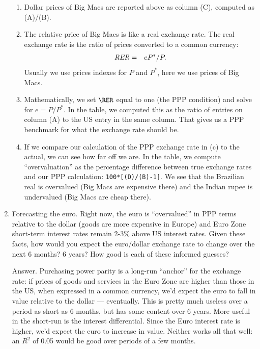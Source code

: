 \begin{enumerate}
\begin{enumerate}
\item Dollar prices of Big Macs are reported above as column (C),
computed as (A)/(B).

\item The relative price of Big Macs is like a real exchange rate.
The real exchange rate is the ratio of prices converted to a common currency:
\begin{eqnarray*}
    \mbox{\it RER\/}  &=&  eP^*/P .
\end{eqnarray*}
Usually we use prices indexes for $P$ and $P^*$, here we use prices of Big Macs.

\item Mathematically, we set $\RER$ equal to one (the PPP condition)
and solve for $e = P/P^*$.
In the table, we computed this as the ratio of entries on column (A) to the US
entry in the same column.
That gives us a PPP benchmark for what the exchange rate should be.

\item If we compare our calculation of the PPP exchange rate in (c) to the actual,
we can see how far off we are.
In the table, we compute ``overvaluation'' as the percentage difference between
true exchange rates and our PPP calculation:  {\tt 100*[(D)/(B)-1]}.
We see that the Brazilian real is overvalued (Big Macs are expensive there)
and the Indian rupee is undervalued (Big Macs are cheap there).
\end{enumerate}

\item Forecasting the euro.
Right now, the euro is ``overvalued'' in PPP terms relative to the
dollar (goods are more expensive in Europe) and Euro Zone short-term interest rates remain 2-3\% above US interest rates.
Given these facts, how would you expect the euro/dollar exchange rate to change over the next 6 months?  6 years?
How good is each of these informed guesses?

Answer.  Purchasing power parity is a long-run ``anchor'' for the
exchange rate:  if prices of goods and services in the Euro Zone
are higher than those in the US, when expressed in a common currency,
we'd expect the euro to fall in value relative to the dollar
--- eventually.
This is pretty much useless over a period as short as 6 months,
but has some content over 6 years.
More useful in the short-run is the interest differential.
Since the Euro interest rate is higher, we'd expect the euro to increase in value.
Neither works all that well:  an $R^2$ of 0.05 would be good over
periods of a few months.
\end{enumerate}
\setlength{\leftmargini}{\oldleftmargini}


